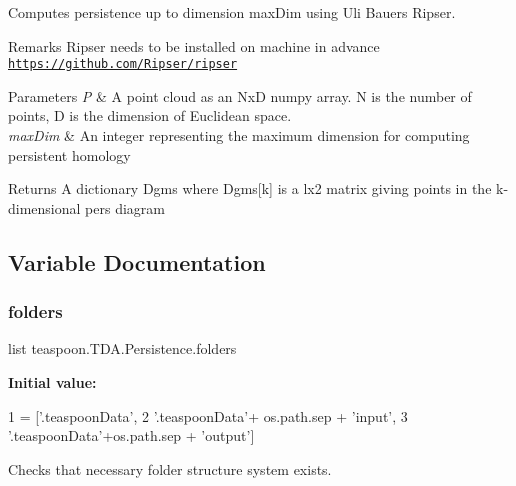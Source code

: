 Computes persistence up to dimension max\+Dim using Uli Bauer\textquotesingle{}s Ripser. 

\begin{DoxyRemark}{Remarks}
Ripser needs to be installed on machine in advance \href{https://github.com/Ripser/ripser}{\tt https\+://github.\+com/\+Ripser/ripser}
\end{DoxyRemark}

\begin{DoxyParams}{Parameters}
{\em P} & A point cloud as an NxD numpy array. N is the number of points, D is the dimension of Euclidean space. \\
\hline
{\em max\+Dim} & An integer representing the maximum dimension for computing persistent homology\\
\hline
\end{DoxyParams}
\begin{DoxyReturn}{Returns}
A dictionary Dgms where Dgms\mbox{[}k\mbox{]} is a lx2 matrix giving points in the k-\/dimensional pers diagram 
\end{DoxyReturn}


\subsection{Variable Documentation}
\mbox{\label{namespaceteaspoon_1_1_t_d_a_1_1_persistence_a5d89c08933153d3fea60fd71e9e16800}} 
\subsubsection{\texorpdfstring{folders}{folders}}
{\footnotesize\ttfamily list teaspoon.\+T\+D\+A.\+Persistence.\+folders}

{\bfseries Initial value\+:}
\begin{DoxyCode}
1 =  [\textcolor{stringliteral}{'.teaspoonData'},
2                \textcolor{stringliteral}{'.teaspoonData'}+ os.path.sep + \textcolor{stringliteral}{'input'},
3                \textcolor{stringliteral}{'.teaspoonData'}+os.path.sep + \textcolor{stringliteral}{'output'}]
\end{DoxyCode}


Checks that necessary folder structure system exists. 

